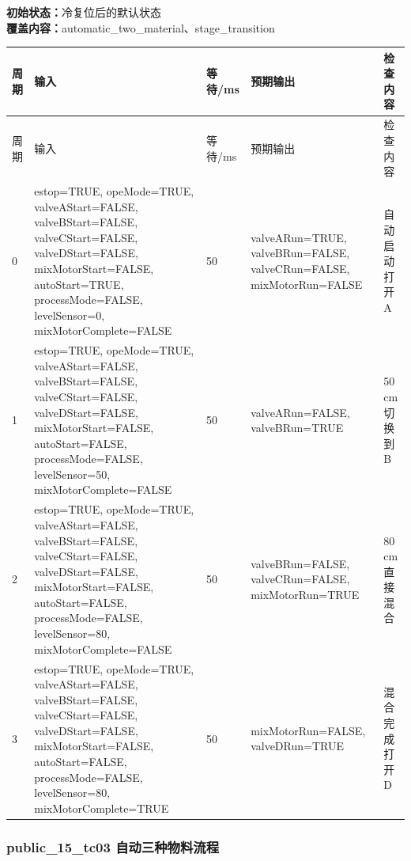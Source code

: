 \noindent\textbf{初始状态：}冷复位后的默认状态\\

\textbf{覆盖内容：}automatic\_two\_material、stage\_transition

\begin{longtable}{L{1.0cm}L{4.7cm}L{1.4cm}L{4.0cm}L{2.1cm}}

\toprule

周期 & 输入 & 等待/ms & 预期输出 & 检查内容\\

\midrule

\endfirsthead

\toprule

周期 & 输入 & 等待/ms & 预期输出 & 检查内容\\

\midrule

\endhead

0 & estop=TRUE, opeMode=TRUE, valveAStart=FALSE, valveBStart=FALSE, valveCStart=FALSE, valveDStart=FALSE, mixMotorStart=FALSE, autoStart=TRUE, processMode=FALSE, levelSensor=0, mixMotorComplete=FALSE & 50 & valveARun=TRUE, valveBRun=FALSE, valveCRun=FALSE, mixMotorRun=FALSE & 自动启动打开 A\\

1 & estop=TRUE, opeMode=TRUE, valveAStart=FALSE, valveBStart=FALSE, valveCStart=FALSE, valveDStart=FALSE, mixMotorStart=FALSE, autoStart=FALSE, processMode=FALSE, levelSensor=50, mixMotorComplete=FALSE & 50 & valveARun=FALSE, valveBRun=TRUE & 50 cm 切换到 B\\

2 & estop=TRUE, opeMode=TRUE, valveAStart=FALSE, valveBStart=FALSE, valveCStart=FALSE, valveDStart=FALSE, mixMotorStart=FALSE, autoStart=FALSE, processMode=FALSE, levelSensor=80, mixMotorComplete=FALSE & 50 & valveBRun=FALSE, valveCRun=FALSE, mixMotorRun=TRUE & 80 cm 直接混合\\

3 & estop=TRUE, opeMode=TRUE, valveAStart=FALSE, valveBStart=FALSE, valveCStart=FALSE, valveDStart=FALSE, mixMotorStart=FALSE, autoStart=FALSE, processMode=FALSE, levelSensor=80, mixMotorComplete=TRUE & 50 & mixMotorRun=FALSE, valveDRun=TRUE & 混合完成打开 D\\

\bottomrule

\end{longtable}

\subsubsection{{\ttfamily public\_15\_tc03} 自动三种物料流程}

